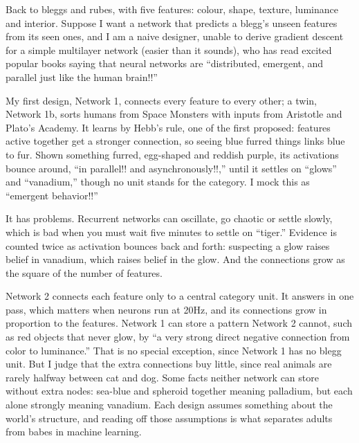 
Back to bleggs and rubes, with five features: colour, shape, texture, luminance and interior. Suppose I want a network that predicts a blegg's unseen features from its seen ones, and I am a naive designer, unable to derive gradient descent for a simple multilayer network (easier than it sounds), who has read excited popular books saying that neural networks are ``distributed, emergent, and parallel just like the human brain!!''

My first design, Network 1, connects every feature to every other; a twin, Network 1b, sorts humans from Space Monsters with inputs from Aristotle and Plato's Academy. It learns by Hebb's rule, one of the first proposed: features active together get a stronger connection, so seeing blue furred things links blue to fur. Shown something furred, egg-shaped and reddish purple, its activations bounce around, ``in parallel!! and asynchronously!!,'' until it settles on ``glows'' and ``vanadium,'' though no unit stands for the category. I mock this as ``emergent behavior!!'' 

It has problems. Recurrent networks can oscillate, go chaotic or settle slowly, which is bad when you must wait five minutes to settle on ``tiger.'' Evidence is counted twice as activation bounces back and forth: suspecting a glow raises belief in vanadium, which raises belief in the glow. And the connections grow as the square of the number of features. 

Network 2 connects each feature only to a central category unit. It answers in one pass, which matters when neurons run at 20Hz, and its connections grow in proportion to the features.  Network 1 can store a pattern Network 2 cannot, such as red objects that never glow, by ``a very strong direct negative connection from color to luminance.''  That is no special exception, since Network 1 has no blegg unit. But I judge that the extra connections buy little, since real animals are rarely halfway between cat and dog. Some facts neither network can store without extra nodes: sea-blue and spheroid together meaning palladium, but each alone strongly meaning vanadium. Each design assumes something about the world's structure, and reading off those assumptions is what separates adults from babes in machine learning.

